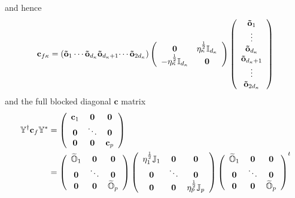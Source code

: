 \documentclass[aps,preprint]{revtex4}%
\begin{document}
and hence%
\[
\mathbf{c}_{f\kappa}=\left(  \mathbf{\tilde{o}}_{1}\cdots\mathbf{\tilde{o}%
}_{d_{\kappa}}\mathbf{\tilde{o}}_{d_{\kappa}+1}\mathbf{\cdots\tilde{o}%
}_{2d_{\kappa}}\right)  \left(
\begin{array}
[c]{cc}%
\mathbf{0} & \eta_{\kappa}^{\frac{1}{2}}\mathbb{I}_{d_{\kappa}}\\
-\eta_{\kappa}^{\frac{1}{2}}\mathbb{I}_{d_{\kappa}} & \mathbf{0}%
\end{array}
\right)  \left(
\begin{array}
[c]{c}%
\mathbf{\tilde{o}}_{1}\\
\vdots\\
\mathbf{\tilde{o}}_{d_{\kappa}}\\
\mathbf{\tilde{o}}_{d_{\kappa}+1}\\
\vdots\\
\mathbf{\tilde{o}}_{2d_{\kappa}}%
\end{array}
\right)
\]
and the full blocked diagonal $\mathbf{c}$ matrix
\begin{align*}
\mathbb{Y}^{\dagger}\mathbf{c}_{f}\mathbb{Y}^{\ast}  &  =\left(
\begin{array}
[c]{ccc}%
\mathbf{c}_{1} & \mathbf{0} & \mathbf{0}\\
\mathbf{0} & \ddots & \mathbf{0}\\
\mathbf{0} & \mathbf{0} & \mathbf{c}_{p}%
\end{array}
\right) \\
&  =\left(
\begin{array}
[c]{ccc}%
\widetilde{\mathbb{O}}_{1} & \mathbf{0} & \mathbf{0}\\
\mathbf{0} & \ddots & \mathbf{0}\\
\mathbf{0} & \mathbf{0} & \widetilde{\mathbb{O}}_{p}%
\end{array}
\right)  \left(
\begin{array}
[c]{ccc}%
\eta_{1}^{\frac{1}{2}}\mathbb{J}_{1} & \mathbf{0} & \mathbf{0}\\
\mathbf{0} & \ddots & \mathbf{0}\\
\mathbf{0} & \mathbf{0} & \eta_{p}^{\frac{1}{2}}\mathbb{J}_{p}%
\end{array}
\right)  \left(
\begin{array}
[c]{ccc}%
\widetilde{\mathbb{O}}_{1} & \mathbf{0} & \mathbf{0}\\
\mathbf{0} & \ddots & \mathbf{0}\\
\mathbf{0} & \mathbf{0} & \widetilde{\mathbb{O}}_{p}%
\end{array}
\right)  ^{t}%
\end{align*}%
\end{document}

